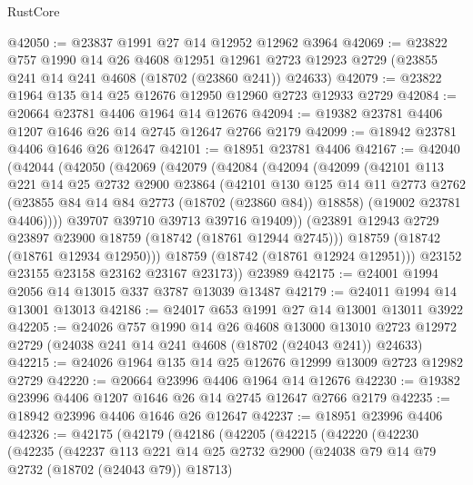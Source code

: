 \begin{lexlean}{RustCore}
\begin{coremodule}
@42050 := @23837 @1991 @27 @14 @12952 @12962 @3964
@42069 := @23822
    @757
    @1990
    @14
    @26
    @4608
    @12951
    @12961
    @2723
    @12923
    @2729
    (@23855 @241 @14 @241 @4608 (@18702 (@23860 @241)) @24633)
@42079 := @23822 @1964 @135 @14 @25 @12676 @12950 @12960 @2723 @12933 @2729
@42084 := @20664 @23781 @4406 @1964 @14 @12676
@42094 := @19382 @23781 @4406 @1207 @1646 @26 @14 @2745 @12647 @2766 @2179
@42099 := @18942 @23781 @4406 @1646 @26 @12647
@42101 := @18951 @23781 @4406
@42167 := @42040
    (@42044
      (@42050
        (@42069
          (@42079
            (@42084
              (@42094
                (@42099
                  (@42101
                    @113
                    @221
                    @14
                    @25
                    @2732
                    @2900
                    @23864
                    (@42101
                      @130
                      @125
                      @14
                      @11
                      @2773
                      @2762
                      (@23855 @84 @14 @84 @2773 (@18702 (@23860 @84)) @18858)
                      (@19002 @23781 @4406))))
                @39707
                @39710
                @39713
                @39716
                @19409))
            (@23891 @12943 @2729 @23897 @23900 @18759 (@18742 (@18761 @12944 @2745)))
            @18759
            (@18742 (@18761 @12934 @12950)))
          @18759
          (@18742 (@18761 @12924 @12951)))
        @23152
        @23155
        @23158
        @23162
        @23167
        @23173))
    @23989
@42175 := @24001 @1994 @2056 @14 @13015 @337 @3787 @13039 @13487
@42179 := @24011 @1994 @14 @13001 @13013
@42186 := @24017 @653 @1991 @27 @14 @13001 @13011 @3922
@42205 := @24026
    @757
    @1990
    @14
    @26
    @4608
    @13000
    @13010
    @2723
    @12972
    @2729
    (@24038 @241 @14 @241 @4608 (@18702 (@24043 @241)) @24633)
@42215 := @24026 @1964 @135 @14 @25 @12676 @12999 @13009 @2723 @12982 @2729
@42220 := @20664 @23996 @4406 @1964 @14 @12676
@42230 := @19382 @23996 @4406 @1207 @1646 @26 @14 @2745 @12647 @2766 @2179
@42235 := @18942 @23996 @4406 @1646 @26 @12647
@42237 := @18951 @23996 @4406
@42326 := @42175
    (@42179
      (@42186
        (@42205
          (@42215
            (@42220
              (@42230
                (@42235
                  (@42237
                    @113
                    @221
                    @14
                    @25
                    @2732
                    @2900
                    (@24038 @79 @14 @79 @2732 (@18702 (@24043 @79)) @18713)

\end{coremodule}
\end{lexlean}
